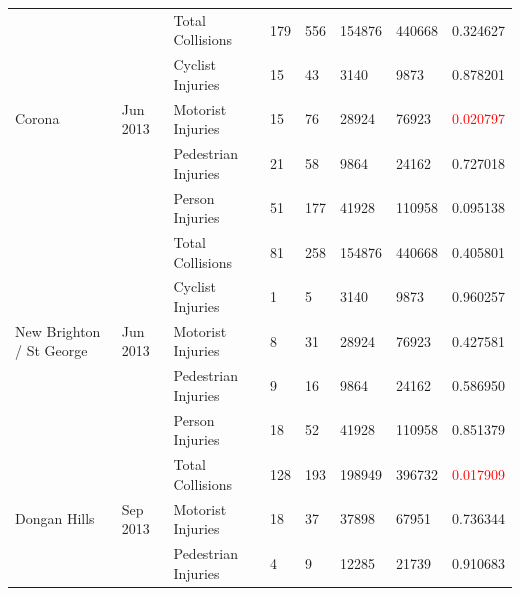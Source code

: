 \documentclass[10pt,journal,compsoc]{IEEEtran}
\begin{document}
\begin{table}[]
\begin{tabular}{|l|l|l|l|l|l|l|l|}
\multirow{5}{*}{Corona}                        & \multirow{5}{*}{Jun 2013} & Total Collisions    & 179       & 556      & 154876     & 440668    & 0.324627 \\ \cline{3-8} 
                                               &                             & Cyclist Injuries    & 15        & 43       & 3140       & 9873      & 0.878201 \\ \cline{3-8} 
                                               &                             & Motorist Injuries   & 15        & 76       & 28924      & 76923     & \textcolor{red}{0.020797} \\ \cline{3-8} 
                                               &                             & Pedestrian Injuries & 21        & 58       & 9864       & 24162     & 0.727018 \\ \cline{3-8} 
                                               &                             & Person Injuries     & 51        & 177      & 41928      & 110958    & 0.095138 \\ \hline
\multirow{5}{*}{New Brighton / St George}      & \multirow{5}{*}{Jun 2013} & Total Collisions    & 81        & 258      & 154876     & 440668    & 0.405801 \\ \cline{3-8} 
                                               &                             & Cyclist Injuries    & 1         & 5        & 3140       & 9873      & 0.960257 \\ \cline{3-8} 
                                               &                             & Motorist Injuries   & 8         & 31       & 28924      & 76923     & 0.427581 \\ \cline{3-8} 
                                               &                             & Pedestrian Injuries & 9         & 16       & 9864       & 24162     & 0.586950 \\ \cline{3-8} 
                                               &                             & Person Injuries     & 18        & 52       & 41928      & 110958    & 0.851379 \\ \hline
\multirow{4}{*}{Dongan Hills}                  & \multirow{4}{*}{Sep 2013} & Total Collisions    & 128       & 193      & 198949     & 396732    & \textcolor{red}{0.017909} \\ \cline{3-8} 
                                               &                             & Motorist Injuries   & 18        & 37       & 37898      & 67951     & 0.736344 \\ \cline{3-8} 
                                               &                             & Pedestrian Injuries & 4         & 9        & 12285      & 21739     & 0.910683 \\ \cline{3-8} 

\end{tabular}
\end{table}
\end{document}

